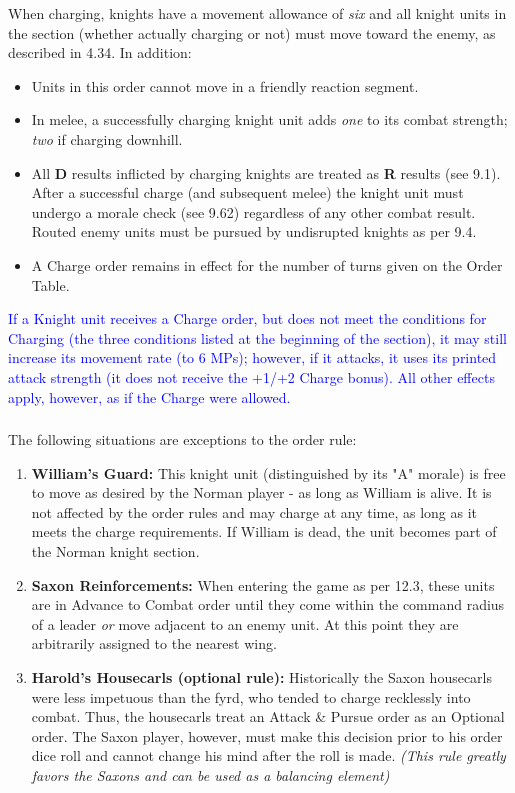 When charging, knights have a movement allowance of \textit{six} and all knight units in the section (whether actually charging or not) must move toward the enemy, as described in 4.34. In addition:

\begin{itemize}
  \item Units in this order cannot move in a friendly reaction segment.
  \item In melee, a successfully charging knight unit adds \textit{one} to its combat strength; \textit{two} if charging downhill.
  \item All \textbf{D} results inflicted by charging knights are treated as \textbf{R} results (see 9.1). After a successful charge (and subsequent melee) the knight unit must undergo a morale check (see 9.62) regardless of any other combat result. Routed enemy units must be pursued by undisrupted knights as per 9.4.
  \item A Charge order remains in effect for the number of turns given on the Order Table.
\end{itemize}

\textcolor{blue}{If a Knight unit receives a Charge order, but does not meet the conditions for Charging (the three conditions listed at the beginning of the section), it may still increase its movement rate (to 6 MPs); however, if it attacks, it uses its printed attack strength (it does not receive the +1/+2 Charge bonus). All other effects apply, however, as if the Charge were allowed.}

\subsubsection[Exceptions to Order Rules]{} The following situations are exceptions to the order rule:

\begin{enumerate}
  \item \textbf{William's Guard:} This knight unit (distinguished by its "A" morale) is free to move as desired by the Norman player - as long as William is alive. It is not affected by the order rules and may charge at any time, as long as it meets the charge requirements. If William is dead, the unit becomes part of the Norman knight section.
  \item \textbf{Saxon Reinforcements:} When entering the game as per 12.3, these units are in Advance to Combat order until they come within the command radius of a leader \textit{or} move adjacent to an enemy unit. At this point they are arbitrarily assigned to the nearest wing.
  \item \textbf{Harold's Housecarls (optional rule):} Historically the Saxon housecarls were less impetuous than the fyrd, who tended to charge recklessly into combat. Thus, the housecarls treat an Attack \& Pursue order as an Optional order. The Saxon player, however, must make this decision prior to his order dice roll and cannot change his mind after the roll is made. \textit{(This rule greatly favors the Saxons and can be used as a balancing element)}
\end{enumerate}

